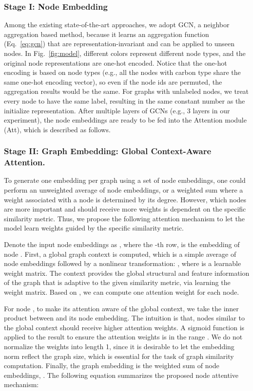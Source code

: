 \documentclass[sigconf]{acmart}
\begin{document}
\subsubsection{Stage I: Node Embedding}
\label{subsec-node-emb}
Among the existing state-of-the-art approaches, we adopt GCN, a neighbor aggregation based method, because it learns an aggregation function (Eq.~\ref{eq:gcn}) that are representation-invariant and can be applied to unseen nodes. In Fig.~\ref{fig:model}, different colors represent different node types, and the original node representations are one-hot encoded. Notice that the one-hot encoding is based on node types (e.g., all the nodes with carbon type share the same one-hot encoding vector), so even if the node ids are permuted, the aggregation results would be the same. For graphs with unlabeled nodes, we treat every node to have the same label, resulting in the same constant number as the initialize representation. After multiple layers of GCNs (e.g., 3 layers in our experiment),  the node embeddings are ready to be fed into the Attention module (Att), which is described as follows.

\subsubsection{Stage II: Graph Embedding: Global Context-Aware Attention.}
\label{subsec-graph-emb}
To generate one embedding per graph using a set of node embeddings, one could perform an unweighted average of node embeddings, or a weighted sum where a weight associated with a node is determined by its degree. However, which nodes are more important and should receive more weights is dependent on the specific similarity metric. Thus, we propose the following attention mechanism to let the model learn weights guided by the specific similarity metric.

Denote the input node embeddings as , where the -th row,  is the embedding of node . First, a global graph context  is computed, which is a simple average of node embeddings followed by a nonlinear transformation: , where  is a learnable weight matrix. The context  provides the global structural and feature information of the graph that is adaptive to the given similarity metric, via learning the weight matrix. Based on , we can compute one attention weight for each node.




For node , to make its attention  aware of the global context, we take the inner product between  and its node embedding. The intuition is that, nodes similar to the global context should receive higher attention weights. A sigmoid function  is applied to the result to ensure the attention weights is in the range . We do not normalize the weights into length 1, since it is desirable to let the embedding norm reflect the graph size, which is essential for the task of graph similarity computation. Finally, the graph embedding  is the weighted sum of node embeddings, . The following equation summarizes the proposed node attentive mechanism:
\end{document}
